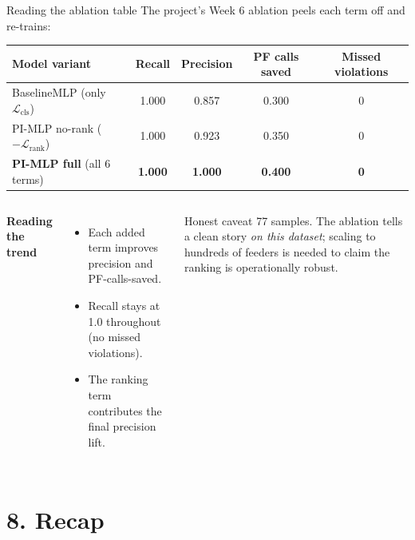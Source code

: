 \documentclass[aspectratio=169,10pt]{beamer}
\begin{document}
\begin{frame}{Reading the ablation table}
The project's Week 6 ablation peels each term off and re-trains:
\vspace{0.3em}
\centering
\small
\begin{tabular}{lcccc}
\toprule
Model variant & Recall & Precision & PF calls saved & Missed violations \\
\midrule
BaselineMLP (only $\mathcal{L}_{\text{cls}}$) & 1.000 & 0.857 & 0.300 & 0 \\
PI-MLP no-rank ($-\mathcal{L}_{\text{rank}}$) & 1.000 & 0.923 & 0.350 & 0 \\
\textbf{PI-MLP full} (all 6 terms) & \textbf{1.000} & \textbf{1.000} & \textbf{0.400} & \textbf{0} \\
\bottomrule
\end{tabular}
\vspace{0.6em}
\begin{columns}[T]
\textbf{Reading the trend}
\begin{itemize}
  \item Each added term improves precision and PF-calls-saved.
  \item Recall stays at 1.0 throughout (no missed violations).
  \item The ranking term contributes the final precision lift.
\end{itemize}
\begin{alertblock}{Honest caveat}
77 samples. The ablation tells a clean story \emph{on this dataset}; scaling to hundreds of feeders is needed to claim the ranking is operationally robust.
\end{alertblock}
\end{columns}
\end{frame}

\section*{8. Recap}
\end{document}
